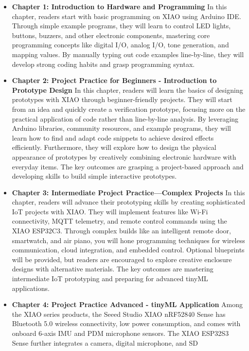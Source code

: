 \documentclass[
  letterpaper,
  DIV=11,
  numbers=noendperiod]{scrreprt}
\begin{document}
\begin{itemize}
\item
  \textbf{Chapter 1: Introduction to Hardware and Programming} In this
  chapter, readers start with basic programming on XIAO using Arduino
  IDE. Through simple example programs, they will learn to control LED
  lights, buttons, buzzers, and other electronic components, mastering
  core programming concepts like digital I/O, analog I/O, tone
  generation, and mapping values. By manually typing out code examples
  line-by-line, they will develop strong coding habits and grasp
  programming syntax.
\item
  \textbf{Chapter 2: Project Practice for Beginners - Introduction to
  Prototype Design} In this chapter, readers will learn the basics of
  designing prototypes with XIAO through beginner-friendly projects.
  They will start from an idea and quickly create a verification
  prototype, focusing more on the practical application of code rather
  than line-by-line analysis. By leveraging Arduino libraries, community
  resources, and example programs, they will learn how to find and adapt
  code snippets to achieve desired effects efficiently. Furthermore,
  they will explore how to design the physical appearance of prototypes
  by creatively combining electronic hardware with everyday items. The
  key outcomes are grasping a project-based approach and developing
  skills to build simple interactive prototypes.
\item
  \textbf{Chapter 3: Intermediate Project Practice---Complex Projects}
  In this chapter, readers will advance their prototyping skills by
  creating sophisticated IoT projects with XIAO. They will implement
  features like Wi-Fi connectivity, MQTT telemetry, and remote control
  commands using the XIAO ESP32C3. Through complex builds like an
  intelligent remote door, smartwatch, and air piano, you will hone
  programming techniques for wireless communication, cloud integration,
  and embedded control. Optional blueprints will be provided, but
  readers are encouraged to explore creative enclosure designs with
  alternative materials. The key outcomes are mastering intermediate IoT
  prototyping and preparing for advanced tinyML applications.
\item
  \textbf{Chapter 4: Project Practice Advanced - tinyML Application}
  Among the XIAO series products, the Seeed Studio XIAO nRF52840 Sense
  has Bluetooth 5.0 wireless connectivity, low power consumption, and
  comes with onboard 6-axis IMU and PDM microphone sensors. The XIAO
  ESP32S3 Sense further integrates a camera, digital microphone, and SD

\end{itemize}
\end{document}
